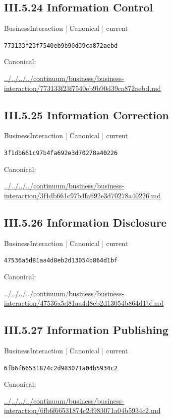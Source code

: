 \documentclass[10pt,a4paper]{article}
\begin{document}
\subsection*{III.5.24 Information Control}
\label{element-773133f23f7540eb9b90d39ca872aebd}
{\small BusinessInteraction | Canonical | current}\par
\texttt{773133f23f7540eb9b90d39ca872aebd}\par
Canonical: \par
{\footnotesize\url{../../../../continuum/business/business-interaction/773133f23f7540eb9b90d39ca872aebd.md}}\par
\subsection*{III.5.25 Information Correction}
\label{element-3f1db661c97b4fa692e3d70278a40226}
{\small BusinessInteraction | Canonical | current}\par
\texttt{3f1db661c97b4fa692e3d70278a40226}\par
Canonical: \par
{\footnotesize\url{../../../../continuum/business/business-interaction/3f1db661c97b4fa692e3d70278a40226.md}}\par
\subsection*{III.5.26 Information Disclosure}
\label{element-47536a5d81aa4d8eb2d13054b864d1bf}
{\small BusinessInteraction | Canonical | current}\par
\texttt{47536a5d81aa4d8eb2d13054b864d1bf}\par
Canonical: \par
{\footnotesize\url{../../../../continuum/business/business-interaction/47536a5d81aa4d8eb2d13054b864d1bf.md}}\par
\subsection*{III.5.27 Information Publishing}
\label{element-6fb6f66531874c2d983071a04b5934c2}
{\small BusinessInteraction | Canonical | current}\par
\texttt{6fb6f66531874c2d983071a04b5934c2}\par
Canonical: \par
{\footnotesize\url{../../../../continuum/business/business-interaction/6fb6f66531874c2d983071a04b5934c2.md}}\par
\end{document}

